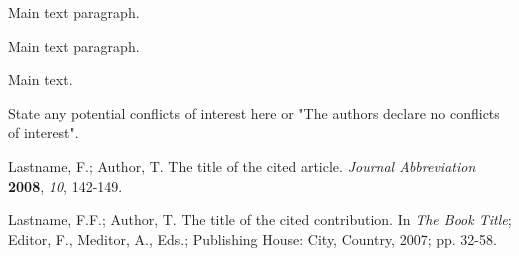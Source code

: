 \documentclass[jmse,article,submit,moreauthors,pdftex,12pt,a4paper]{mdpi}
\begin{document}
Main text paragraph.


Main text paragraph.



Main text.



State any potential conflicts of interest here or "The authors declare no conflicts of interest". 


\makeatletter
\renewcommand\@biblabel[1]{#1. }
\makeatother

\begin{thebibliography}{1}

Lastname, F.; Author, T. The title of the cited article. {\em Journal Abbreviation} {\bf 2008}, {\em 10}, 142-149.

Lastname, F.F.; Author, T. The title of the cited contribution. In {\em The Book Title}; Editor, F., Meditor, A., Eds.; Publishing House: City, Country, 2007; pp. 32-58.

\end{thebibliography}

%
%
\end{document}
